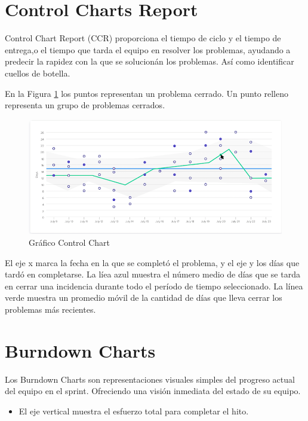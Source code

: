 \documentclass[11pt]{article}
\begin{document}
\section*{Control Charts Report}

Control Chart Report (CCR) proporciona el tiempo de ciclo y el tiempo de entrega,o el tiempo que tarda el equipo en resolver los problemas, ayudando a predecir la rapidez con la que se solucionán los problemas. Así como identificar cuellos de botella.

En la Figura \ref{fig:control} los puntos representan un problema cerrado. Un punto relleno representa un grupo de problemas cerrados. 

\begin{figure}[h!] 
\centering
    \includegraphics[width=1\textwidth]{control_chart.PNG}
\caption{Gráfico Control Chart}
\label{fig:control}
\end{figure}

El eje x marca la fecha en la que se completó el problema, y el eje y los días que tardó en completarse. La líea azul muestra el número medio de días que se tarda en cerrar una incidencia durante todo el período de tiempo seleccionado. La línea verde muestra un promedio móvil de la cantidad de días que lleva cerrar los problemas más recientes. 


\section*{Burndown Charts}

Los Burndown Charts son representaciones visuales simples del progreso actual del equipo en el sprint. Ofreciendo una visión inmediata del estado de su equipo.

\begin{itemize}
    \item El eje vertical muestra el esfuerzo total para completar el hito.
\end{itemize}
\end{document}
